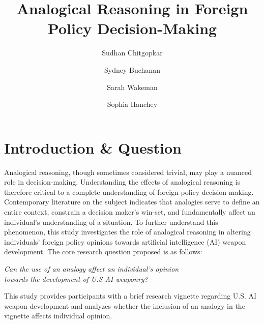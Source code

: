 \documentclass[12pt]{article}
\title {Analogical Reasoning in Foreign Policy Decision-Making}
\author {Sudhan Chitgopkar
  \and Sydney Buchanan
  \and Sarah Wakeman
  \and Sophia Hanchey}
\date {}
\begin{document}
\tableofcontents
\newpage
\section {Introduction \& Question}
Analogical reasoning, though sometimes considered trivial, may play a nuanced role in decision-making. Understanding the effects of analogical reasoning is therefore critical to a complete understanding of foreign policy decision-making. Contemporary literature on the subject indicates that analogies serve to define an entire context, constrain a decision maker’s win-set, and fundamentally affect an individual’s understanding of a situation. To further understand this phenomenon, this study investigates the role of analogical reasoning in altering individuals’ foreign policy opinions towards artificial intelligence (AI) weapon development. The core research question proposed is as follows:
\begin{center}
\textit{Can the use of an analogy affect an individual’s opinion \\ towards the development of U.S AI weaponry?}
\end{center}
This study provides participants with a brief research vignette regarding U.S. AI weapon development and analyzes whether the inclusion of an analogy in the vignette affects individual opinion.
\end{document}
